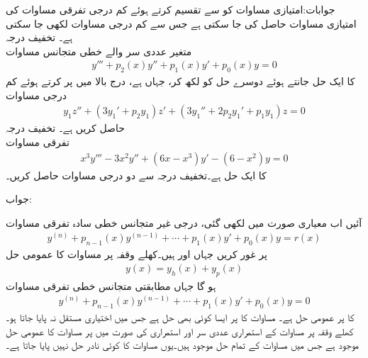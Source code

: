 جوابات:امتیازی مساوات کو   سے تقسیم کرتے ہوئے کم درجی تفرقی مساوات کی امتیازی مساوات حاصل کی جا سکتی ہے جس سے کم درجی مساوات لکھی جا سکتی ہے۔
\quad تخفیف درجہ\\
متغیر عددی سر والے خطی متجانس مساوات
\begin{align*}
y'''+p_2(x)y''+p_1(x)y'+p_0(x)y=0
\end{align*}
کا ایک حل  جانتے ہوئے دوسرے حل کو  لکھ کر، جہاں  ہے، درج بالا میں پر کرتے ہوئے کم درجی مساوات 
\begin{align*}
y_1z''+(3y_1'+p_2y_1)z'+(3y_1''+2p_2y_1'+p_1y_1)z=0
\end{align*}
حاصل کریں  ہے۔
\quad تخفیف درجہ\\
تفرقی مساوات 
\begin{align*}
x^3y'''-3x^2y''+(6x-x^3)y'-(6-x^2)y=0
\end{align*}
کا ایک حل  ہے۔تخفیف درجہ سے دو درجی مساوات حاصل کریں۔

جواب:

آئیں اب معیاری صورت میں لکھی گئی،  درجی غیر متجانس خطی سادہ تفرقی مساوات
\begin{align}\label{مساوات_سادہ_بلند_غیر_متجانس_الف}
y^{(n)}+p_{n-1}(x)y^{(n-1)}+\cdots+p_1(x)y'+p_0(x)y=r(x)
\end{align}
پر غور کریں جہاں  اور  ہیں۔کھلے وقفہ  پر مساوات  کا عمومی حل
\begin{align}\label{مساوات_سادہ_بلند_غیر_متجانس_ب}
y(x)=y_h(x)+y_p(x)
\end{align}
ہو گا جہاں  مطابقتی متجانس خطی تفرقی مساوات
\begin{align}\label{مساوات_سادہ_بلند_مطابقتی_متجانس_الف}
y^{(n)}+p_{n-1}(x)y^{(n-1)}+\cdots+p_1(x)y'+p_0(x)y=0
\end{align}
کا  پر عمومی حل ہے۔  مساوات   کا  پر  ایسا کوئی بھی حل ہے جس میں اختیاری مستقل نہ پایا جاتا ہو۔ کھلے وقفہ  پر مساوات  کے استمراری عددی سر اور استمراری  کی صورت میں  پر مساوات  کا عمومی حل موجود ہے جس میں مساوات  کے تمام حل موجود ہیں۔یوں مساوات  کا کوئی نادر حل نہیں پایا جاتا ہے۔

